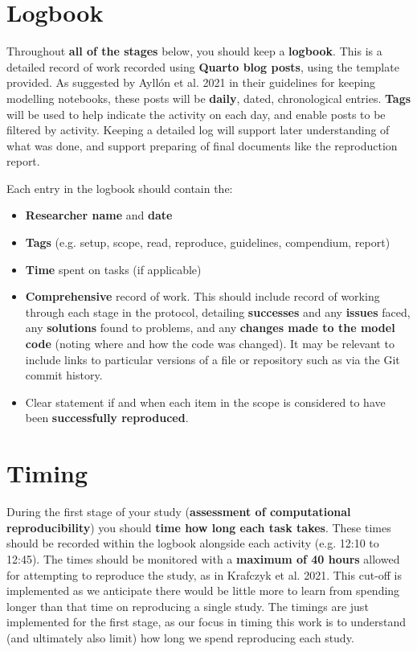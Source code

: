 \newpage
\section{Logbook}

Throughout \textbf{all of the stages} below, you should keep a \textbf{logbook}. This is a detailed record of work recorded using \textbf{Quarto blog posts}, using the template provided. As suggested by Ayllón et al. 2021\autocite{ayllon_keeping_2021} in their guidelines for keeping modelling notebooks, these posts will be \textbf{daily}, dated, chronological entries. \textbf{Tags} will be used to help indicate the activity on each day, and enable posts to be filtered by activity. Keeping a detailed log will support later understanding of what was done, and support preparing of final documents like the reproduction report.

Each entry in the logbook should contain the:
\begin{itemize}
    \item \textbf{Researcher name} and \textbf{date}
    \item \textbf{Tags} (e.g. setup, scope, read, reproduce, guidelines, compendium, report)
    \item \textbf{Time} spent on tasks (if applicable)
    \item \textbf{Comprehensive} record of work. This should include record of working through each stage in the protocol, detailing \textbf{successes} and any \textbf{issues} faced, any \textbf{solutions} found to problems, and any \textbf{changes made to the model code} (noting where and how the code was changed). It may be relevant to include links to particular versions of a file or repository such as via the Git commit history.
    \item Clear statement if and when each item in the scope is considered to have been \textbf{successfully reproduced}.
\end{itemize}

\vspace{0.5cm}
\section{Timing}

During the first stage of your study (\textbf{assessment of computational reproducibility}) you should \textbf{time how long each task takes}. These times should be recorded within the logbook alongside each activity (e.g. 12:10 to 12:45). The times should be monitored with a \textbf{maximum of 40 hours} allowed for attempting to reproduce the study, as in Krafczyk et al. 2021.\autocite{krafczyk_learning_2021} This cut-off is implemented as we anticipate there would be little more to learn from spending longer than that time on reproducing a single study. The timings are just implemented for the first stage, as our focus in timing this work is to understand (and ultimately also limit) how long we spend reproducing each study.

